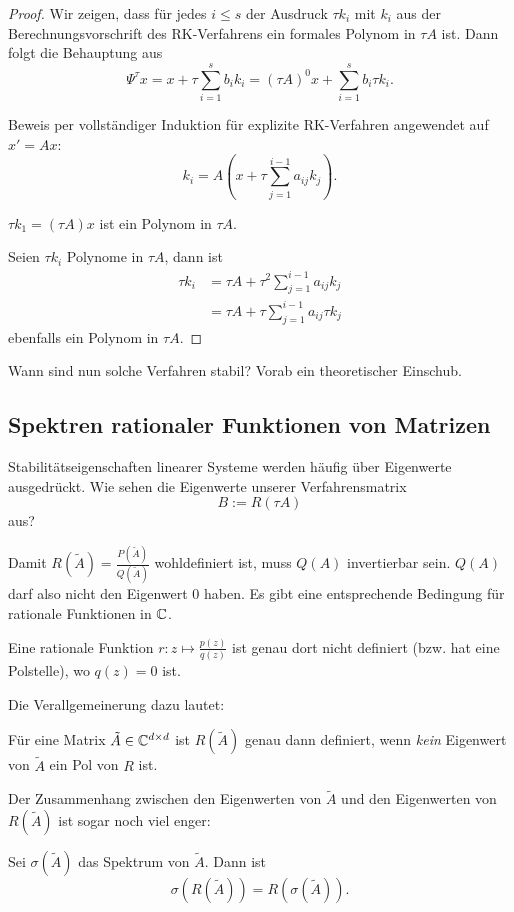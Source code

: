 \documentclass[
 a4paper,
 12pt,
 parskip=half
 ]{scrreprt}
\theoremstyle{plain}
\theoremstyle{definition}
\numberwithin{rmrk}{chapter}
\numberwithin{defn}{chapter}
\numberwithin{exmp}{chapter}
\numberwithin{prgp}{subsection}
\numberwithin{equation}{chapter}
\begin{document}
\begin{proof}
  Wir zeigen, dass für jedes $i \le s$ der Ausdruck $\tau k_i$ mit $k_i$ aus der
  Berechnungsvorschrift des RK-Verfahrens ein formales Polynom in $\tau A$ ist.
  Dann folgt die Behauptung aus
  \[ \Psi^\tau x = x + \tau \sum_{i=1}^s b_i k_i = (\tau A)^0 x + \sum_{i=1}^s
    b_i \tau k_i. \]

  Beweis per vollständiger Induktion für explizite RK-Verfahren angewendet auf
  $x ' = Ax$:
  \[ k_i = A \left( x  + \tau \sum_{j=1}^{i-1} a_{ij} k_j \right). \]
  
  $\tau k_1 = (\tau A) x$ ist ein Polynom in $\tau A$.

  Seien $\tau k_i$ Polynome in $\tau A$, dann ist
  \begin{align*}
    \tau k_i &= \tau A + \tau^2 \sum_{j=1}^{i-1} a_{ij} k_j \\
             &= \tau A + \tau \sum_{j=1}^{i-1} a_{ij} \tau k_j
  \end{align*}
  ebenfalls ein Polynom in $\tau A$.
\end{proof}

Wann sind nun solche Verfahren stabil? Vorab ein theoretischer Einschub.

\subsection{Spektren rationaler Funktionen von Matrizen} %
Stabilitätseigenschaften linearer Systeme werden häufig über Eigenwerte
ausgedrückt. Wie sehen die Eigenwerte unserer Verfahrensmatrix
\[ B := R( \tau A ) \]
aus?

Damit $R( \tilde{A} ) = \frac{P(\tilde{A})}{Q(\tilde{A})}$ wohldefiniert ist,
muss $Q(A)$ invertierbar sein. $Q(A)$ darf also nicht den Eigenwert 0 haben. Es
gibt eine entsprechende Bedingung für rationale Funktionen in $\mathbb{C}$.

\begin{lem} %
  Eine rationale Funktion $r: z \mapsto \frac{p(z)}{q(z)}$ ist genau dort nicht
  definiert (bzw. hat eine Polstelle), wo $q(z) = 0$ ist.
\end{lem}

Die Verallgemeinerung dazu lautet:
\begin{thm} %
  Für eine Matrix $\tilde{A} \in \mathbb{C}^{d \times d}$ ist $R(\tilde{A})$ genau dann
  definiert, wenn \emph{kein} Eigenwert von $\tilde{A}$ ein Pol von $R$ ist.
\end{thm}

Der Zusammenhang zwischen den Eigenwerten von $\tilde{A}$ und den Eigenwerten
von $R(\tilde{A})$ ist sogar noch viel enger:
\begin{thm} %
  Sei $\sigma(\tilde{A})$ das Spektrum von $\tilde{A}$. Dann ist
  \[ \sigma( R(\tilde{A}) ) = R( \sigma(\tilde{A}) ). \]
\end{thm}
\end{document}
